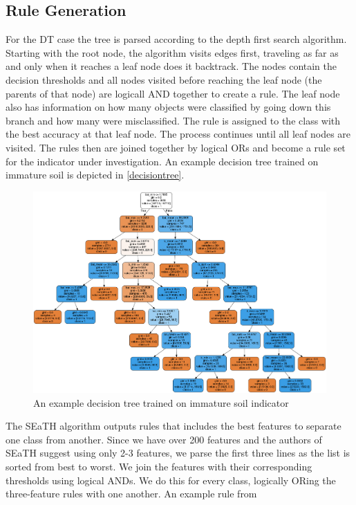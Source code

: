 \documentclass[authoryear, review,12pt,number]{elsarticle}
\begin{document}
\subsection{Rule Generation}
For the DT case the tree is parsed according to the depth first search
algorithm. Starting with the root node, the algorithm visits edges first,
traveling as far as and only when it reaches a leaf node does it backtrack. The
nodes contain the decision thresholds and all nodes visited before reaching the
leaf node (the parents of that node) are logicall AND together to create a rule.
The leaf node also has information on how many objects were classified by going
down this branch and how many were misclassified. The rule is assigned to the
class with the best accuracy at that leaf node. The process continues until all
leaf nodes are visited. The rules then are joined together by logical ORs and
become a rule set for the indicator under investigation. An example decision
tree trained on immature soil is depicted in \ref{decisiontree}.
\begin{figure}
    \label{fig:decisiontree}
\includegraphics[width=\textwidth]{diagrams/natfo_immature_soil_dt.png}
    \caption{An example decision tree trained on immature soil indicator}
\end{figure}
The SEaTH algorithm outputs rules that includes the best features to separate 
one class from another. Since we have over 200 features and the authors of 
SEaTH suggest using only 2-3 features, we parse the first three lines as the 
list is sorted from best to worst. We join the features with their 
corresponding thresholds using logical ANDs. We do this for every class, 
logically ORing the three-feature rules with one another. An example rule from 
\end{document}
